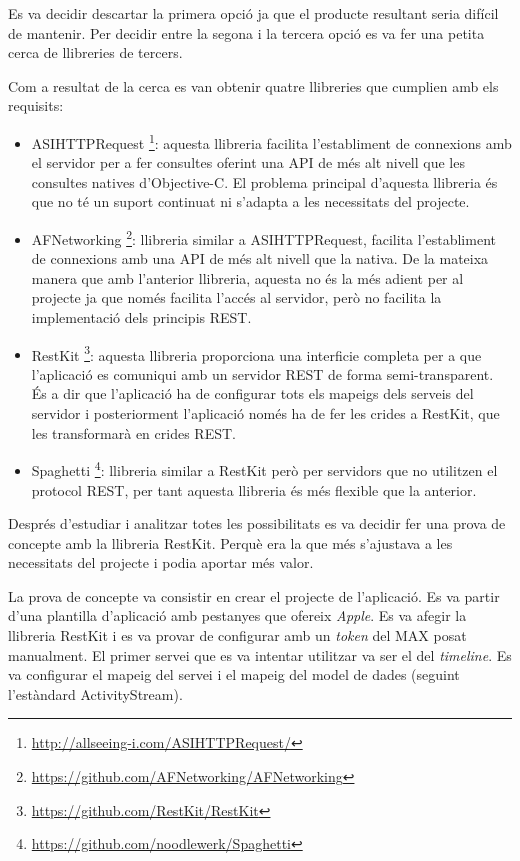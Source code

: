 Es va decidir descartar la primera opció ja que el producte resultant seria difícil de mantenir. Per decidir entre la segona i la tercera opció es va fer una petita cerca de llibreries de tercers.

Com a resultat de la cerca es van obtenir quatre llibreries que cumplien amb els requisits:
\begin{itemize}
    \item  ASIHTTPRequest \footnote{\url{http://allseeing-i.com/ASIHTTPRequest/}}: aquesta llibreria facilita l'establiment de connexions amb el servidor per a fer consultes oferint una API de més alt nivell que les consultes natives d'Objective-C. El problema principal d'aquesta llibreria és que no té un suport continuat ni s'adapta a les necessitats del projecte.
    \item  AFNetworking \footnote{\url{https://github.com/AFNetworking/AFNetworking}}: llibreria similar a ASIHTTPRequest, facilita l'establiment de connexions amb una API de més alt nivell que la nativa. De la mateixa manera que amb l'anterior llibreria, aquesta no és la més adient per al projecte ja que només facilita l'accés al servidor, però no facilita la implementació dels principis REST.
    \item  RestKit \footnote{\url{https://github.com/RestKit/RestKit}}: aquesta llibreria proporciona una interficie completa per a que l'aplicació es comuniqui amb un servidor REST de forma semi-transparent. És a dir que l'aplicació ha de configurar tots els mapeigs dels serveis del servidor i posteriorment l'aplicació només ha de fer les crides a RestKit, que les transformarà en crides REST.
    \item  Spaghetti \footnote{\url{https://github.com/noodlewerk/Spaghetti}}: llibreria similar a RestKit però per servidors que no utilitzen el protocol REST, per tant aquesta llibreria és més flexible que la anterior.
\end{itemize}

Després d'estudiar i analitzar totes les possibilitats es va decidir fer una prova de concepte amb la llibreria RestKit\cite{restkit}. Perquè era la que més s'ajustava a les necessitats del projecte i podia aportar més valor. 

La prova de concepte va consistir en crear el projecte de l'aplicació. Es va partir d'una plantilla d'aplicació amb pestanyes que ofereix \textit{Apple}. Es va afegir la llibreria RestKit i es va provar de configurar amb un \textit{token} del MAX posat manualment. El primer servei que es va intentar utilitzar va ser el del \textit{timeline}. Es va configurar el mapeig del servei i el mapeig del model de dades (seguint l'estàndard ActivityStream\cite{activityStream}).

